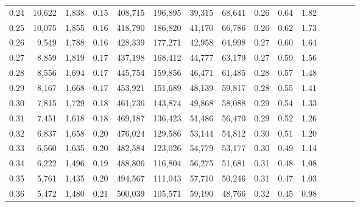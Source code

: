 \begin{tabular}{rrrcrrrrrrrrrrr}
0.24 &  10,622 &  1,838 &                                       0.15 &  408,715 &  196,895 &   39,315 &   68,641 &  0.26 &  0.64 &                         1.82 \\
0.25 &  10,075 &  1,855 &                                       0.16 &  418,790 &  186,820 &   41,170 &   66,786 &  0.26 &  0.62 &                         1.73 \\
0.26 &   9,549 &  1,788 &                                       0.16 &  428,339 &  177,271 &   42,958 &   64,998 &  0.27 &  0.60 &                         1.64 \\
0.27 &   8,859 &  1,819 &                                       0.17 &  437,198 &  168,412 &   44,777 &   63,179 &  0.27 &  0.59 &                         1.56 \\
0.28 &   8,556 &  1,694 &                                       0.17 &  445,754 &  159,856 &   46,471 &   61,485 &  0.28 &  0.57 &                         1.48 \\
0.29 &   8,167 &  1,668 &                                       0.17 &  453,921 &  151,689 &   48,139 &   59,817 &  0.28 &  0.55 &                         1.41 \\
0.30 &   7,815 &  1,729 &                                       0.18 &  461,736 &  143,874 &   49,868 &   58,088 &  0.29 &  0.54 &                         1.33 \\
0.31 &   7,451 &  1,618 &                                       0.18 &  469,187 &  136,423 &   51,486 &   56,470 &  0.29 &  0.52 &                         1.26 \\
0.32 &   6,837 &  1,658 &                                       0.20 &  476,024 &  129,586 &   53,144 &   54,812 &  0.30 &  0.51 &                         1.20 \\
0.33 &   6,560 &  1,635 &                                       0.20 &  482,584 &  123,026 &   54,779 &   53,177 &  0.30 &  0.49 &                         1.14 \\
0.34 &   6,222 &  1,496 &                                       0.19 &  488,806 &  116,804 &   56,275 &   51,681 &  0.31 &  0.48 &                         1.08 \\
0.35 &   5,761 &  1,435 &                                       0.20 &  494,567 &  111,043 &   57,710 &   50,246 &  0.31 &  0.47 &                         1.03 \\
0.36 &   5,472 &  1,480 &                                       0.21 &  500,039 &  105,571 &   59,190 &   48,766 &  0.32 &  0.45 &                         0.98 \\

\end{tabular}
